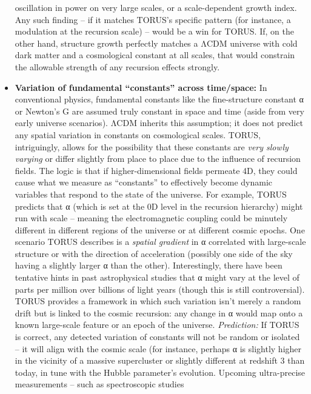 \documentclass[
]{article}
\begin{document}
\begin{itemize}
  oscillation in power on very large scales, or a scale-dependent growth
  index. Any such finding -- if it matches TORUS's specific pattern (for
  instance, a modulation at the recursion scale) -- would be a win for
  TORUS. If, on the other hand, structure growth perfectly matches a
  ΛCDM universe with cold dark matter and a cosmological constant at all
  scales, that would constrain the allowable strength of any recursion
  effects strongly.
\item
  \textbf{Variation of fundamental ``constants'' across time/space:} In
  conventional physics, fundamental constants like the fine-structure
  constant α or Newton's G are assumed truly constant in space and time
  (aside from very early universe scenarios). ΛCDM inherits this
  assumption; it does not predict any spatial variation in constants on
  cosmological scales. TORUS, intriguingly, allows for the possibility
  that these constants are \emph{very slowly varying} or differ slightly
  from place to place due to the influence of recursion fields. The
  logic is that if higher-dimensional fields permeate 4D, they could
  cause what we measure as ``constants'' to effectively become dynamic
  variables that respond to the state of the universe. For example,
  TORUS predicts that α (which is set at the 0D level in the recursion
  hierarchy) might run with scale -- meaning the electromagnetic
  coupling could be minutely different in different regions of the
  universe or at different cosmic epochs\hspace{0pt}. One scenario TORUS
  describes is a \emph{spatial gradient} in α correlated with
  large-scale structure or with the direction of acceleration (possibly
  one side of the sky having a slightly larger α than the
  other)\hspace{0pt}. Interestingly, there have been tentative hints in
  past astrophysical studies that α might vary at the level of parts per
  million over billions of light years (though this is still
  controversial). TORUS provides a framework in which such variation
  isn't merely a random drift but is linked to the cosmic recursion: any
  change in α would map onto a known large-scale feature or an epoch of
  the universe. \emph{Prediction:} If TORUS is correct, any detected
  variation of constants will not be random or isolated -- it will align
  with the cosmic scale (for instance, perhaps α is slightly higher in
  the vicinity of a massive supercluster or slightly different at
  redshift 3 than today, in tune with the Hubble parameter's evolution.
  Upcoming ultra-precise measurements -- such as spectroscopic studies

\end{itemize}
\end{document}
